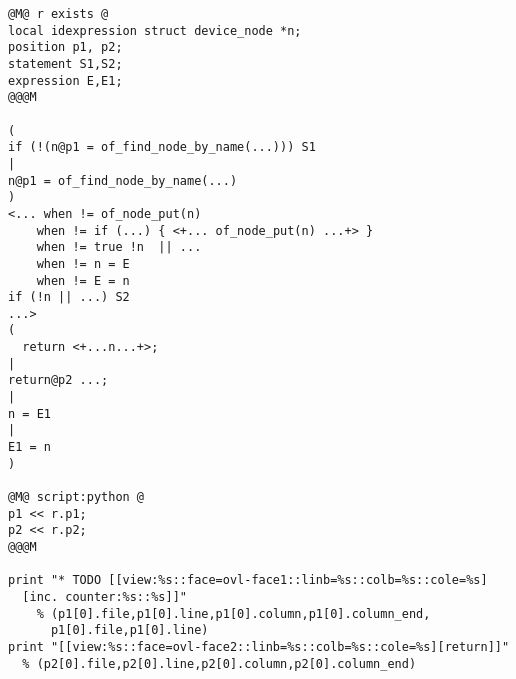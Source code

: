 \begin{lstlisting}[language=Cocci]
@M@ r exists @
local idexpression struct device_node *n;
position p1, p2;
statement S1,S2;
expression E,E1;
@@@M

(
if (!(n@p1 = of_find_node_by_name(...))) S1
|
n@p1 = of_find_node_by_name(...)
)
<... when != of_node_put(n)
    when != if (...) { <+... of_node_put(n) ...+> }
    when != true !n  || ...
    when != n = E
    when != E = n
if (!n || ...) S2
...>
(
  return <+...n...+>;
|
return@p2 ...;
|
n = E1
|
E1 = n
)

@M@ script:python @
p1 << r.p1;
p2 << r.p2;
@@@M

print "* TODO [[view:%s::face=ovl-face1::linb=%s::colb=%s::cole=%s]
  [inc. counter:%s::%s]]"
    % (p1[0].file,p1[0].line,p1[0].column,p1[0].column_end,
      p1[0].file,p1[0].line)
print "[[view:%s::face=ovl-face2::linb=%s::colb=%s::cole=%s][return]]"
  % (p2[0].file,p2[0].line,p2[0].column,p2[0].column_end)
\end{lstlisting}


